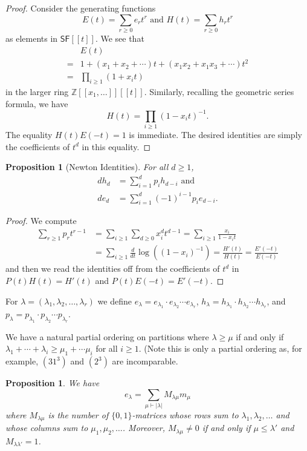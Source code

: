 \documentclass[12pt]{article}
\theoremstyle{plain}
\newtheorem{proposition}[theorem]{Proposition}
\theoremstyle{definition}
\theoremstyle{remark}
\numberwithin{equation}{section}
\begin{document}
\begin{proof}
Consider the generating functions
\[ E(t) = \sum_{r \ge 0} e_r t^r
\textrm{ and }
H(t) = \sum_{r \ge 0} h_r t^r \]
as elements in $\mathsf{SF}[[t]]$.
We see that
\begin{align*}
& E(t)\\
 =& 1 + (x_1+x_2+\cdots)t
+ (x_1x_2+x_1x_3+\cdots)t^2 \\
=&\prod_{i \ge 1} (1+x_i t)
\end{align*}
in the larger ring $\mathbb{Z}[[x_1,\ldots]][[t]]$.
Similarly, recalling the geometric series formula, we have
\[
H(t) = \prod_{i \ge 1} (1-x_i t)^{-1} .
\]
The equality $H(t)E(-t)=1$ is immediate.
The desired identities are simply the coefficients of $t^d$
in this equality.
\end{proof}

\begin{proposition}[Newton Identities] For all $d \ge 1$,
\begin{align*}
dh_d&=\sum_{i=1}^d p_i h_{d-i} \textrm{ and} \\ 
de_d&=\sum_{i=1}^d (-1)^{i-1} p_i e_{d-i}.
\end{align*}
\end{proposition}

\begin{proof}
We compute
\begin{align*}
\sum_{r \ge 1} p_r t^{r-1}
&= \sum_{i \ge 1} \sum_{d \ge 0} x_i^d t^{d-1}
= \sum_{i \ge 1} \frac{x_i}{1-x_it}\\
&= \sum_{i \ge 1} \frac{d}{dt}\log\left(
\left(1-x_i\right)^{-1}\right)
= \frac{H'(t)}{H(t)} = \frac{E'(-t)}{E(-t)}
\end{align*}
and then we read the identities off from 
the coefficients of $t^d$ in $P(t)H(t)=H'(t)$
and $P(t)E(-t)=E'(-t)$.
\end{proof}

For $\lambda=(\lambda_1,\lambda_2,\ldots,\lambda_r)$ we define
$e_\lambda = e_{\lambda_1}\cdot e_{\lambda_2} \cdots e_{\lambda_r}$,
$h_\lambda = h_{\lambda_1}\cdot h_{\lambda_2} \cdots h_{\lambda_r}$, and
$p_\lambda = p_{\lambda_1}\cdot p_{\lambda_2} \cdots p_{\lambda_r}$.

We have a natural partial ordering on partitions where $\lambda \ge \mu$
if and only if
$\lambda_1 + \cdots + \lambda_i \ge \mu_1 + \cdots \mu_i$
for all $i \ge 1$.
(Note this is only a partial ordering as, for example, $(31^3)$ and $(2^3)$
are incomparable.

\begin{proposition} \label{prop:01matrix}
We have
\[
e_\lambda = \sum_{\mu \vdash |\lambda|} M_{\lambda \mu} m_\mu
\]
where $M_{\lambda \mu}$ is the number of $\{0,1\}$-matrices whose
rows sum to $\lambda_1,\lambda_2,\ldots$ and whose columns
sum to $\mu_1,\mu_2,\ldots$.
Moreover, $M_{\lambda\mu} \ne 0$ if and only if $\mu \le \lambda'$
and $M_{\lambda\lambda'}=1$.
\end{proposition}
\end{document}
